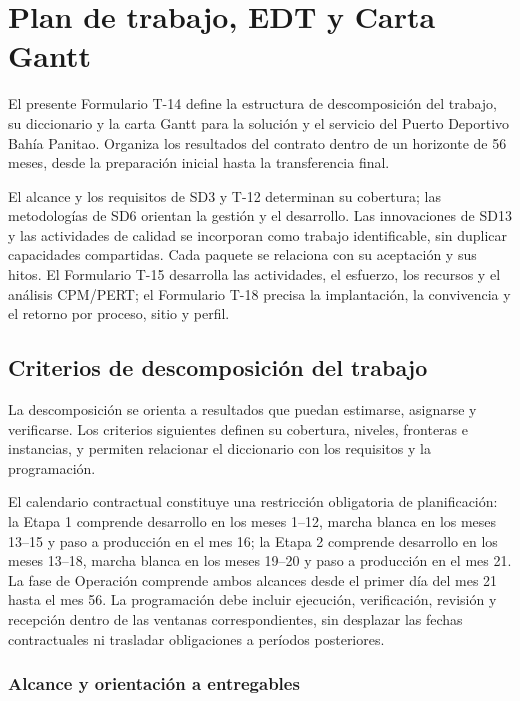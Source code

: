 \chapter*{Plan de trabajo, EDT y Carta Gantt}

El presente Formulario T-14 define la estructura de descomposición del trabajo, su diccionario y la carta Gantt para la solución y el servicio del Puerto Deportivo Bahía Panitao. Organiza los resultados del contrato dentro de un horizonte de 56 meses, desde la preparación inicial hasta la transferencia final.

El alcance y los requisitos de SD3 y T-12 determinan su cobertura; las metodologías de SD6 orientan la gestión y el desarrollo. Las innovaciones de SD13 y las actividades de calidad se incorporan como trabajo identificable, sin duplicar capacidades compartidas. Cada paquete se relaciona con su aceptación y sus hitos. El Formulario T-15 desarrolla las actividades, el esfuerzo, los recursos y el análisis CPM/PERT; el Formulario T-18 precisa la implantación, la convivencia y el retorno por proceso, sitio y perfil.

\section{Criterios de descomposición del trabajo}

La descomposición se orienta a resultados que puedan estimarse, asignarse y verificarse. Los criterios siguientes definen su cobertura, niveles, fronteras e instancias, y permiten relacionar el diccionario con los requisitos y la programación.

El calendario contractual constituye una restricción obligatoria de planificación: la Etapa 1 comprende desarrollo en los meses 1--12, marcha blanca en los meses 13--15 y paso a producción en el mes 16; la Etapa 2 comprende desarrollo en los meses 13--18, marcha blanca en los meses 19--20 y paso a producción en el mes 21. La fase de Operación comprende ambos alcances desde el primer día del mes 21 hasta el mes 56. La programación debe incluir ejecución, verificación, revisión y recepción dentro de las ventanas correspondientes, sin desplazar las fechas contractuales ni trasladar obligaciones a períodos posteriores.

\subsection{Alcance y orientación a entregables}

